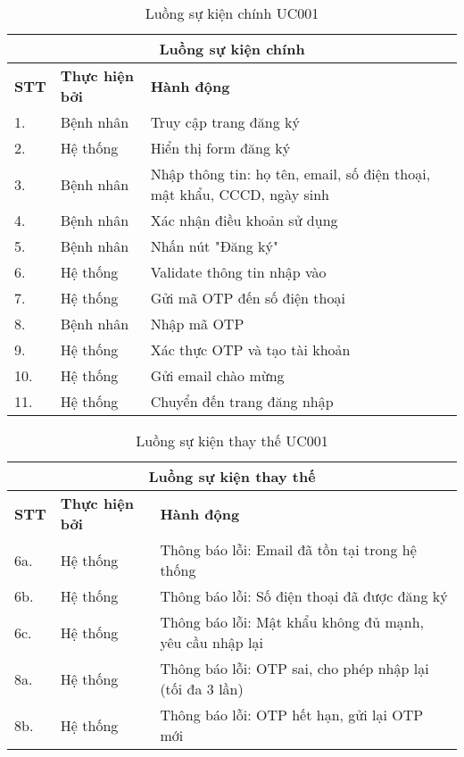 \documentclass[../DoAn.tex]{subfiles}
\begin{document}
\begin{table}[H]
\centering
\begin{tabular}{|p{1cm}|p{3cm}|p{9cm}|}
\hline
\multicolumn{3}{|c|}{\textbf{Luồng sự kiện chính}} \\
\hline
\textbf{STT} & \textbf{Thực hiện bởi} & \textbf{Hành động} \\
\hline
1. & Bệnh nhân & Truy cập trang đăng ký \\
\hline
2. & Hệ thống & Hiển thị form đăng ký \\
\hline
3. & Bệnh nhân & Nhập thông tin: họ tên, email, số điện thoại, mật khẩu, CCCD, ngày sinh \\
\hline
4. & Bệnh nhân & Xác nhận điều khoản sử dụng \\
\hline
5. & Bệnh nhân & Nhấn nút "Đăng ký" \\
\hline
6. & Hệ thống & Validate thông tin nhập vào \\
\hline
7. & Hệ thống & Gửi mã OTP đến số điện thoại \\
\hline
8. & Bệnh nhân & Nhập mã OTP \\
\hline
9. & Hệ thống & Xác thực OTP và tạo tài khoản \\
\hline
10. & Hệ thống & Gửi email chào mừng \\
\hline
11. & Hệ thống & Chuyển đến trang đăng nhập \\
\hline
\end{tabular}
\caption{Luồng sự kiện chính UC001}
\end{table}

\begin{table}[H]
\centering
\begin{tabular}{|p{1cm}|p{3cm}|p{9cm}|}
\hline
\multicolumn{3}{|c|}{\textbf{Luồng sự kiện thay thế}} \\
\hline
\textbf{STT} & \textbf{Thực hiện bởi} & \textbf{Hành động} \\
\hline
6a. & Hệ thống & Thông báo lỗi: Email đã tồn tại trong hệ thống \\
\hline
6b. & Hệ thống & Thông báo lỗi: Số điện thoại đã được đăng ký \\
\hline
6c. & Hệ thống & Thông báo lỗi: Mật khẩu không đủ mạnh, yêu cầu nhập lại \\
\hline
8a. & Hệ thống & Thông báo lỗi: OTP sai, cho phép nhập lại (tối đa 3 lần) \\
\hline
8b. & Hệ thống & Thông báo lỗi: OTP hết hạn, gửi lại OTP mới \\
\hline
\end{tabular}
\caption{Luồng sự kiện thay thế UC001}
\end{table}
\end{document}
